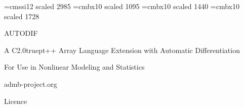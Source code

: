 \font\halfinch=cmssi12 scaled 2985
\font\smallheadfont=cmbx10 scaled 1095
\font\largeheadfont=cmbx10 scaled 1440
\font\hugeheadfont=cmbx10 scaled 1728

\vspace*{2in}
{\hugeheadfont
\centerline{\halfinch AUTODIF}}
\vspace{0.5in}
{\largeheadfont
\centerline{A C\raise2.0truept\hbox{\smallheadfont ++} Array Language Extension with Automatic Differentiation}
\bigskip
\centerline{For Use in Nonlinear Modeling and Statistics}
\vspace{0.5in}
\centerline{admb-project.org}}

\vfill
\eject

\centerline{\LARGE Licence}


\twelverm
\vfil
\supereject


